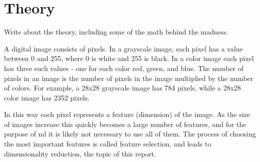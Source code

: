 \chapter{Theory}\label{cha:theory}
Write about the theory, including some of the math behind the madness.

A digital image consists of pixels. In a grayscale image, each pixel has a value between 0 and 255, where 0 is white and 255 is black. In a color image each pixel has three such values - one for each color red, green, and blue. The number of pixels in an image is the number of pixels in the image multiplied by the number of colors. For example, a 28x28 grayscale image has 784 pixels, while a 28x28 color image has 2352 pixels.

In this way each pixel represents a feature (dimension) of the image. As the size of images increase this quickly becomes a large number of features, and for the purpose of \gls{ml} it is likely not necessary to use all of them. The process of choosing the most important features is called feature selection, and leads to dimensionality reduction, the topic of this report.

